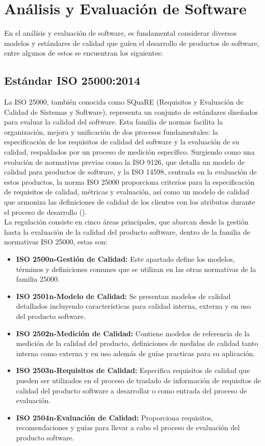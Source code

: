 \section{Análisis y Evaluación de Software}
En el análisis y evaluación de software, es fundamental considerar diversos modelos y estándares de calidad que guíen el desarrollo de productos de software, entre algunos de estos se encuentran los siguientes: 
\subsection{Estándar ISO 25000:2014}
La ISO 25000, también conocida como SQuaRE (Requisitos y Evaluación de Calidad de Sistemas y Software), representa un conjunto de estándares diseñados para evaluar la calidad del software. Esta familia de normas facilita la organización, mejora y unificación de dos procesos fundamentales: la especificación de los requisitos de calidad del software y la evaluación de su calidad, respaldados por un proceso de medición específico. Surgiendo como una evolución de normativas previas como la ISO 9126, que detalla un modelo de calidad para productos de software, y la ISO 14598, centrada en la evaluación de estos productos, la norma ISO 25000 proporciona criterios para la especificación de requisitos de calidad, métricas y evaluación, así como un modelo de calidad que armoniza las definiciones de calidad de los clientes con los atributos durante el proceso de desarrollo (\cite{iso25000}).\\ \indent
La regulación consiste en cinco áreas principales, que abarcan desde la gestión hasta la evaluación de la calidad del producto software, dentro de la familia de normativas ISO 25000, estas son:

\begin{itemize}[topsep=0pt]  
    \addtolength\itemsep{-4mm}
    \item \textbf{ISO 2500n-Gestión de Calidad:} Este apartado define los modelos, términos y definiciones comunes que se utilizan en las otras normativas de la familia 25000.
    \item \textbf{ISO 2501n-Modelo de Calidad:} Se presentan modelos de calidad detallados incluyendo características para calidad interna, externa y en uso del producto software.
    \item \textbf{ISO 2502n-Medición de Calidad:}  Contiene modelos de referencia de la medición de la calidad del producto, definiciones de medidas de calidad tanto interna como externa y en uso además
    de guías practicas para su aplicación.
    \item \textbf{ISO 2503n-Requisitos de Calidad:} Especifica requisitos de calidad que pueden ser utilizados en el proceso de traslado de información de requisitos de calidad del producto software a desarrollar o como entrada del proceso de evaluación.
    \item \textbf{ISO 2504n-Evaluación de Calidad:} Proporciona requisitos, recomendaciones y guías para llevar a cabo el proceso de evaluación del producto software.
\end{itemize}

